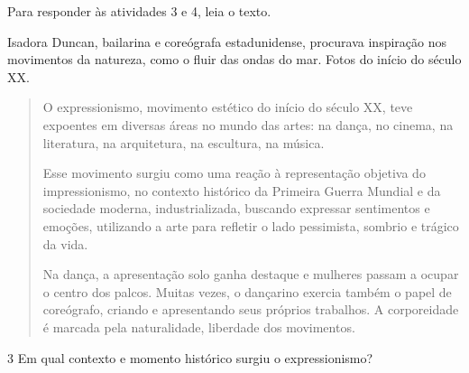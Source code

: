 \begin{escolha}

Para responder às atividades 3 e 4, leia o texto.


Isadora Duncan, bailarina e coreógrafa estadunidense, procurava
inspiração nos movimentos da natureza, como o fluir das ondas do mar.
Fotos do início do século XX.


\begin{quote}
O expressionismo, movimento estético do início do século XX, teve
expoentes em diversas áreas no mundo das artes: na dança, no cinema, na
literatura, na arquitetura, na escultura, na música.

Esse movimento surgiu como uma reação à representação objetiva do
impressionismo, no contexto histórico da Primeira Guerra Mundial e da
sociedade moderna, industrializada, buscando expressar sentimentos e
emoções, utilizando a arte para refletir o lado pessimista, sombrio e
trágico da vida.

Na dança, a apresentação solo ganha destaque e mulheres passam a ocupar
o centro dos palcos. Muitas vezes, o dançarino exercia também o papel de
coreógrafo, criando e apresentando seus próprios trabalhos. A
corporeidade é marcada pela naturalidade, liberdade dos
movimentos.
\end{quote}

\num{3} Em qual contexto e momento histórico surgiu o expressionismo?



\end{escolha}

